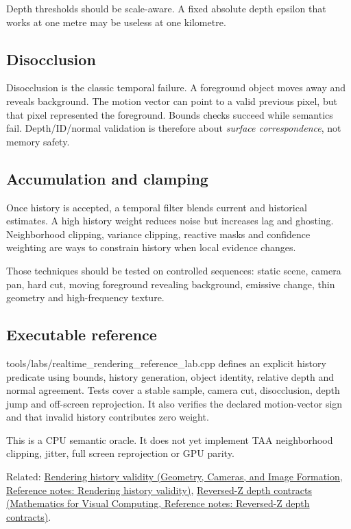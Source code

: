Depth thresholds should be scale-aware. A fixed absolute depth epsilon that works at one metre may be useless at one kilometre.

\subsection{Disocclusion}\label{appendix-e8c352e39466-disocclusion}

\hypertarget{appendix-e8c352e39466-disocclusion}{}

Disocclusion is the classic temporal failure. A foreground object moves away and reveals background. The motion vector can point to a valid previous pixel, but that pixel represented the foreground. Bounds checks succeed while semantics fail. Depth/ID/normal validation is therefore about \emph{surface correspondence}, not memory safety.

\subsection{Accumulation and clamping}\label{appendix-e8c352e39466-accumulation-and-clamping}

\hypertarget{appendix-e8c352e39466-accumulation-and-clamping}{}

Once history is accepted, a temporal filter blends current and historical estimates. A high history weight reduces noise but increases lag and ghosting. Neighborhood clipping, variance clipping, reactive masks and confidence weighting are ways to constrain history when local evidence changes.

Those techniques should be tested on controlled sequences: static scene, camera pan, hard cut, moving foreground revealing background, emissive change, thin geometry and high-frequency texture.

\subsection{Executable reference}\label{appendix-e8c352e39466-executable-reference}

\hypertarget{appendix-e8c352e39466-executable-reference}{}

tools/labs/realtime\_rendering\_reference\_lab.cpp defines an explicit history predicate using bounds, history generation, object identity, relative depth and normal agreement. Tests cover a stable sample, camera cut, disocclusion, depth jump and off-screen reprojection. It also verifies the declared motion-vector sign and that invalid history contributes zero weight.

This is a CPU semantic oracle. It does not yet implement TAA neighborhood clipping, jitter, full screen reprojection or GPU parity.

Related: \href{../03-Geometry-Cameras-and-Image-Formation/main.pdf\#nameddest=appendix-2e7e9fd28a2c}{Rendering history validity (Geometry, Cameras, and Image Formation, Reference notes: Rendering history validity)}, \href{../02-Mathematics-for-Visual-Computing/main.pdf\#nameddest=appendix-275ec8847057}{Reversed-Z depth contracts (Mathematics for Visual Computing, Reference notes: Reversed-Z depth contracts)}.
